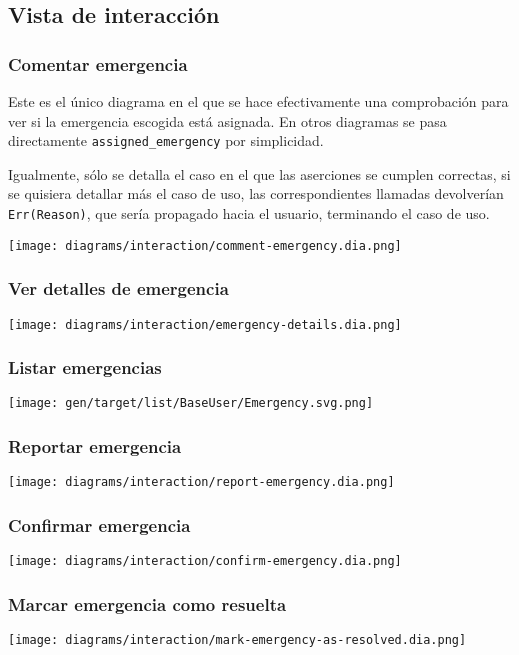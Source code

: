 \subsection{Vista de interacción}

\subsubsection{Comentar emergencia}
Este es el único diagrama en el que se hace efectivamente una comprobación para ver si la emergencia escogida está asignada. En otros diagramas se pasa directamente \texttt{assigned\_emergency} por simplicidad.

Igualmente, sólo se detalla el caso en el que las aserciones se cumplen correctas, si se quisiera detallar más el caso de uso, las correspondientes llamadas devolverían \texttt{Err(Reason)}, que sería propagado hacia el usuario, terminando el caso de uso.

\texttt{[image: diagrams/interaction/comment-emergency.dia.png]}

\subsubsection{Ver detalles de emergencia}
\texttt{[image: diagrams/interaction/emergency-details.dia.png]}

\subsubsection{Listar emergencias}
\texttt{[image: gen/target/list/BaseUser/Emergency.svg.png]}

\subsubsection{Reportar emergencia}
\texttt{[image: diagrams/interaction/report-emergency.dia.png]}

\subsubsection{Confirmar emergencia}
\texttt{[image: diagrams/interaction/confirm-emergency.dia.png]}

\subsubsection{Marcar emergencia como resuelta}
\texttt{[image: diagrams/interaction/mark-emergency-as-resolved.dia.png]}

